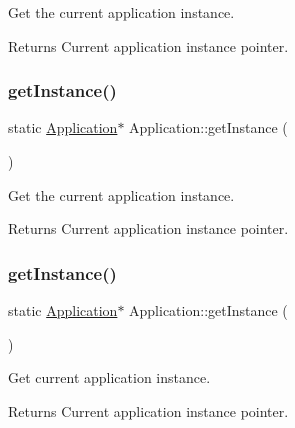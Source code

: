Get the current application instance. 

\begin{DoxyReturn}{Returns}
Current application instance pointer. 
\end{DoxyReturn}
\mbox{\label{classApplication_ab5dba709d2e806d5d83c297bab6cdace}} 
\subsubsection{\texorpdfstring{get\+Instance()}{getInstance()}\hspace{0.1cm}{\footnotesize\ttfamily [3/12]}}
{\footnotesize\ttfamily static \hyperlink{classApplication}{Application}$\ast$ Application\+::get\+Instance (\begin{DoxyParamCaption}{ }\end{DoxyParamCaption})\hspace{0.3cm}{\ttfamily [static]}}



Get the current application instance. 

\begin{DoxyReturn}{Returns}
Current application instance pointer. 
\end{DoxyReturn}
\mbox{\label{classApplication_ab5dba709d2e806d5d83c297bab6cdace}} 
\subsubsection{\texorpdfstring{get\+Instance()}{getInstance()}\hspace{0.1cm}{\footnotesize\ttfamily [4/12]}}
{\footnotesize\ttfamily static \hyperlink{classApplication}{Application}$\ast$ Application\+::get\+Instance (\begin{DoxyParamCaption}{ }\end{DoxyParamCaption})\hspace{0.3cm}{\ttfamily [static]}}



Get current application instance. 

\begin{DoxyReturn}{Returns}
Current application instance pointer. 
\end{DoxyReturn}
\mbox{\label{classApplication_a723b8bba6edce3769a8d771770ca10e1}} 
